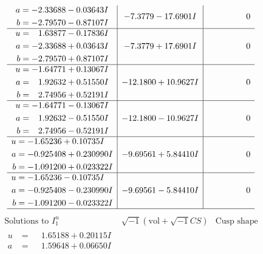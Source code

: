 \documentclass[1p]{elsarticle_modified}
\theoremstyle{definition}
\newcommand{\I}{\sqrt{-1}}
\begin{document}
$$\begin{array}{c|c|c}
\begin{aligned}
a &= -2.33688 - 0.03643 I \\
b &= -2.79570 - 0.87107 I\end{aligned}
 & -7.3779 - 17.6901 I & \phantom{-0.000000 } 0 \\ \hline\begin{aligned}
u &= \phantom{-}1.63877 - 0.17836 I \\
a &= -2.33688 + 0.03643 I \\
b &= -2.79570 + 0.87107 I\end{aligned}
 & -7.3779 + 17.6901 I & \phantom{-0.000000 } 0 \\ \hline\begin{aligned}
u &= -1.64771 + 0.13067 I \\
a &= \phantom{-}1.92632 + 0.51550 I \\
b &= \phantom{-}2.74956 + 0.52191 I\end{aligned}
 & -12.1800 + 10.9627 I & \phantom{-0.000000 } 0 \\ \hline\begin{aligned}
u &= -1.64771 - 0.13067 I \\
a &= \phantom{-}1.92632 - 0.51550 I \\
b &= \phantom{-}2.74956 - 0.52191 I\end{aligned}
 & -12.1800 - 10.9627 I & \phantom{-0.000000 } 0 \\ \hline\begin{aligned}
u &= -1.65236 + 0.10735 I \\
a &= -0.925408 + 0.230990 I \\
b &= -1.091200 + 0.023322 I\end{aligned}
 & -9.69561 + 5.84410 I & \phantom{-0.000000 } 0 \\ \hline\begin{aligned}
u &= -1.65236 - 0.10735 I \\
a &= -0.925408 - 0.230990 I \\
b &= -1.091200 - 0.023322 I\end{aligned}
 & -9.69561 - 5.84410 I & \phantom{-0.000000 } 0\\
 \hline 
 \end{array}$$\newpage$$\begin{array}{c|c|c}  
\text{Solutions to }I^u_{1}& \I (\text{vol} + \sqrt{-1}CS) & \text{Cusp shape}\\
 \hline 
\begin{aligned}
u &= \phantom{-}1.65188 + 0.20115 I \\
a &= \phantom{-}1.59648 + 0.06650 I \\

\end{aligned}
\end{array}$$
\end{document}
